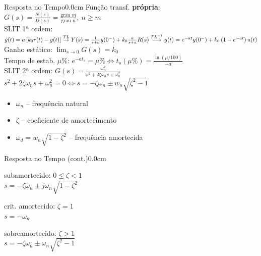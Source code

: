 \documentclass[portuguese,10pt,3col]{cheatsheet}
\begin{document}
\begin{multicols}{3}
\begin{cheatsheetbox}{Resposta no Tempo}{0.0cm}
	Função transf. \textbf{própria}: $G(s) = \frac{N(s)}{D(s)} = \frac{\text{grau } m}{\text{grau } n}, \ n \geq m$ \\
	
	SLIT 1ª ordem: \\ $\dot{y}(t) = a\left[k_0 r(t) - y(t)\right] \stackrel{TL}{\rightarrow} Y(s) = \frac{1}{s + a}y(0^-) + k_0 \frac{a}{s + a}R(s) \\ \stackrel{TL^{-1}}{\longrightarrow} y(t) = e^{-at}y(0^-) + k_0\left(1 - e^{-at}\right)u(t)$ \\
	Ganho estático: $\lim_{s \to 0} G(s) = k_0$ \\
	Tempo de estab. $\mu \%$: $e^{-at_s } = \mu \% \Leftrightarrow t_s(\mu \%) = \frac{\ln(\mu / 100)}{-a}$ \\
	SLIT 2ª ordem: $G(s) = \frac{\omega_n^2}{s^2 + 2\zeta \omega_n s + \omega_n^2}$ \\
	$s^2 + 2\zeta \omega_n s + \omega_n^2 = 0 \Leftrightarrow s = -\zeta\omega_n \pm w_n \sqrt{\zeta^2 - 1}$
	\begin{itemize}
	    \item $\omega_n$ -- frequência natural
	    \item $\zeta$ -- coeficiente de amortecimento
	    \item $\omega_d = w_n \sqrt{1 - \zeta^2}$ -- frequência amortecida
	\end{itemize}
\end{cheatsheetbox}

\begin{cheatsheetbox}{Resposta no Tempo (cont.)}{0.0cm}
    \begin{minipage}{.60\textwidth}
        subamortecido: $0 \leq \zeta < 1$ \\
        $s = -\zeta\omega_n \pm j\omega_n\sqrt{1 - \zeta^2}$
            
        crit. amortecido: $\zeta = 1$ \\
        $s = -\omega_n$
            
        sobreamortecido: $\zeta > 1$ \\
        $s = -\zeta\omega_n \pm \omega_n\sqrt{\zeta^2 - 1}$ \\
        

\end{minipage}
\end{cheatsheetbox}
\end{multicols}
\end{document}
